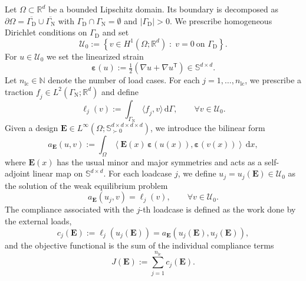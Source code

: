 \documentclass[preprint,3p]{elsarticle}
\newcommand{\tens}[1]{\bm{\mathit{#1}}}             %
\newcommand{\tenss}[1]{\bm{\mathbf{#1}}}            %
\newcommand{\tensf}[1]{\bm{\mathbf{#1}}}            %
\newcommand{\trn}{\mathsf{T}}                       %
\newcommand{\strain}{\tenss{\varepsilon}}           %
\newcommand{\nlc}{n_\mathrm{lc}}                    %
\begin{document}
Let $\Omega\subset\mathbb{R}^d$ be a bounded Lipschitz domain. Its boundary is decomposed as $\partial\Omega=\overline{\Gamma_\mathrm{D}}\cup\overline{\Gamma_\mathrm{N}}$ with $\Gamma_\mathrm{D}\cap\Gamma_\mathrm{N}=\emptyset$ and $\lvert\Gamma_\mathrm{D}\rvert>0$. We prescribe homogeneous Dirichlet conditions on $\Gamma_\mathrm{D}$ and set
%
\begin{equation}\label{eq:U0}
\mathcal{U}_0
:=\left\{\tens{v}\in H^1(\Omega;\mathbb{R}^d)\;:\;\tens{v}=\tens{0}\ \text{on }\Gamma_\mathrm{D}\right\}.
\end{equation}
%
For $\tens{u}\in\mathcal{U}_0$ we set the linearized strain
%
\begin{equation}\label{eq:strain_def}
\strain(\tens{u}) :=\tfrac12\left(\nabla\tens{u}+\nabla\tens{u}^{\trn}\right)\in \mathbb{S}^{d\times d}.
\end{equation}
%
Let $\nlc\in\mathbb{N}$ denote the number of load cases.
%
For each $j=1,\dots,\nlc$, we prescribe a traction $\tens{f}_j\in L^2(\Gamma_\mathrm{N};\mathbb{R}^d)$ and define
%
\begin{equation}\label{eq:load_functional}
\ell_j(\tens{v}) := \int_{\Gamma_\mathrm{N}}\langle \tens{f}_j,\tens{v}\rangle\,\mathrm{d}\Gamma, \qquad \forall \tens{v}\in\mathcal{U}_0.
\end{equation}
%
Given a design $\tensf{E}\in L^\infty(\Omega;\mathbb{S}^{d\times d\times d\times d}_{\succ0})$, we introduce the bilinear form
%
\begin{equation}\label{eq:bilinear_form}
a_{\tensf{E}}(\tens{u},\tens{v})
:=\int_{\Omega}\left\langle \tensf{E}(\tens{x})\,\strain(\tens{u}(\tens{x})),\strain(\tens{v}(\tens{x}))\right\rangle\,\mathrm{d}\tens{x},
\end{equation}
%
where $\tensf{E}(\tens{x})$ has the usual minor and major symmetries and acts as a self-adjoint linear map on
$\mathbb{S}^{d\times d}$. For each loadcase $j$, we define $\tens{u}_j=\tens{u}_j(\tensf{E})\in\mathcal{U}_0$ as the solution of the weak equilibrium problem
%
\begin{equation}\label{eq:state_cont}
a_{\tensf{E}}(\tens{u}_j,\tens{v})=\ell_j(\tens{v}),\qquad \forall \tens{v}\in\mathcal{U}_0.
\end{equation}
%
The compliance associated with the $j$-th loadcase is defined as the work done by the external loads,
%
\begin{equation}\label{eq:compliance_single}
c_j(\tensf{E}) := \ell_j(\tens{u}_j(\tensf{E})) = a_{\tensf{E}}(\tens{u}_j(\tensf{E}),\tens{u}_j(\tensf{E})),
\end{equation}
%
and the objective functional is the sum of the individual compliance terms
%
\begin{equation}\label{eq:multi_compliance}
J(\tensf{E}) := \sum_{j=1}^{\nlc} c_j(\tensf{E}).
\end{equation}
\end{document}
